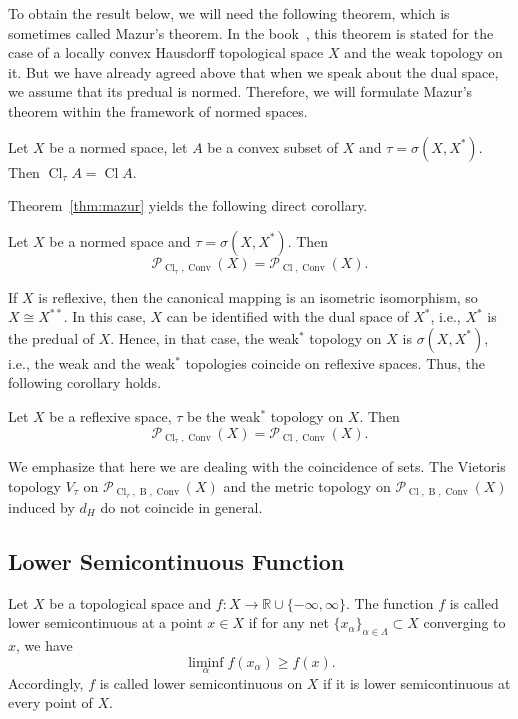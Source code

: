 \documentclass{svproc}
\def\Cl{\operatorname{Cl}}
\def\Conv{\operatorname{Conv}}
\def\B{\operatorname{B}}
\begin{document}
To obtain the result below, we will need the following theorem, which is sometimes called Mazur's theorem. In the book~\cite{Rudin}, this theorem is stated for the case of a locally convex Hausdorff topological space $X$ and the weak topology on it. But we have already agreed above that when we speak about the dual space, we assume that its predual is normed. Therefore, we will formulate Mazur's theorem within the framework of normed spaces.

\begin{theorem}\label{thm:mazur}
Let $X$ be a normed space, let $A$ be a convex subset of $X$ and $\tau = \sigma(X, X^*)$. Then $\Cl_{\tau} A = \Cl A$.
\end{theorem}

Theorem~\ref{thm:mazur} yields the following direct corollary.

\begin{corollary}\label{cor:equal_0}
Let $X$ be a normed space and $\tau = \sigma(X, X^*)$. Then 
$$\mathcal{P}_{\Cl_{\tau}, \Conv}(X) = \mathcal{P}_{\Cl, \Conv}(X).$$
\end{corollary}

If $X$ is reflexive, then the canonical mapping is an isometric isomorphism, so $X\cong X^{**}$. In this case, $X$ can be identified with the dual space of $X^*$, i.e., $X^*$ is the predual of $X$. Hence, in that case, the weak$^*$ topology on $X$ is $\sigma(X, X^*)$, i.e., the weak and the weak$^*$ topologies coincide on reflexive spaces. Thus, the following corollary holds.

\begin{corollary}\label{cor:equal}
Let $X$ be a reflexive space, $\tau$ be the weak$^*$ topology on $X$. Then
$$\mathcal{P}_{\Cl_{\tau}, \Conv}(X) = \mathcal{P}_{\Cl, \Conv}(X).$$
\end{corollary}

We emphasize that here we are dealing with the coincidence of sets. The Vietoris topology $V_{\tau}$ on $\mathcal{P}_{\Cl_{\tau}, \B, \Conv}(X)$ and the metric topology on $\mathcal{P}_{\Cl, \B, \Conv}(X)$ induced by $d_H$ do not coincide in general.


\subsection{Lower Semicontinuous Function}\label{sec:semicont}

\begin{definition}
Let $X$ be a topological space and $f\colon X\rightarrow \mathbb{R}\cup\{-\infty, \infty\}$. The function $f$ is called lower semicontinuous at a point $x\in X$ if for any net $\{x_{\alpha}\}_{\alpha\in \Lambda}\subset X$ converging to $x$, we have $$\liminf\limits_{\alpha} f(x_{\alpha}) \ge f(x).$$
Accordingly, $f$ is called lower semicontinuous on $X$ if it is lower semicontinuous at every point of $X$.
\end{definition}
\end{document}
